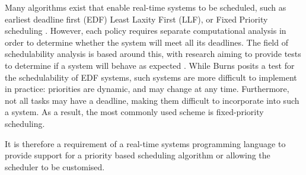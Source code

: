 \par\bigskip\noindent
Many algorithms exist that enable real-time systems to be
scheduled, such as earliest deadline first (EDF) Least Laxity First (LLF), or
Fixed Priority scheduling \cite{real-time-systems}.  However, each policy
requires separate computational analysis in order to determine whether the
system will meet all its deadlines.  The field of schedulability analysis is
based around this, with research aiming to provide tests to determine if a
system will behave as expected \cite{4815215,burns-sched-analysis}.  While
Burns posits a test for the schedulability of EDF systems, such systems are
more difficult to implement in practice: priorities are dynamic, and may change
at any time. Furthermore, not all tasks may have a deadline, making them
difficult to incorporate into such a system.  As a result, the most commonly
used scheme is fixed-priority scheduling.  
\par\bigskip\noindent
It is
therefore a requirement of a real-time systems programming language to provide
support for a priority based scheduling algorithm or allowing the scheduler to
be customised. 

